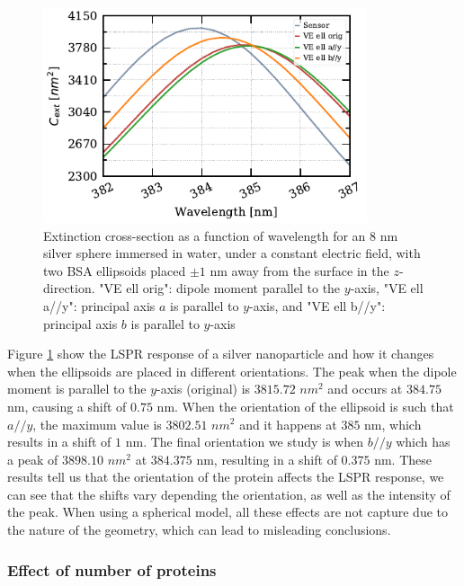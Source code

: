 \begin{figure} %
     \centering
     \includegraphics[width=0.85\textwidth]{two_ve_ell_mult_config.pdf} 
     \caption{Extinction cross-section as a function of wavelength for an $8$ nm
     silver sphere immersed in water, under a constant electric field, with two BSA ellipsoids placed 
     $\pm 1$ nm away from the surface in the $z$-direction. "VE ell orig": dipole moment parallel to the $y$-axis,
     "VE ell a//y": principal axis $a$ is parallel to $y$-axis, and "VE ell b//y": principal axis $b$ is parallel to $y$-axis}
     \label{fig:two_ell_mult_config}
  \end{figure}
 
Figure \ref{fig:two_ell_mult_config} show the LSPR response of a silver nanoparticle and how it changes when the ellipsoids 
are placed in different orientations. The peak when the dipole moment is parallel to the $y$-axis (original)
is $3815.72$ $nm^2$ and occurs at $384.75$ nm, causing a shift of $0.75$ nm. When the orientation of the ellipsoid 
is such that $a//y$, the maximum value is $3802.51$ $nm^2$ and it happens at $385$ nm, which results in a shift of 
$1$ nm. The final orientation we study is when $b//y$ which has a peak of $3898.10$ $nm^2$ at $384.375$ nm, resulting 
in a shift of $0.375$ nm. These results tell us that the orientation of the protein affects the LSPR response, we can 
see that the shifts vary depending the orientation, as well as the intensity of the peak. When using a spherical model, 
all these effects are not capture due to the nature of the geometry, which can lead to misleading conclusions.

\subsubsection{Effect of number of proteins}

